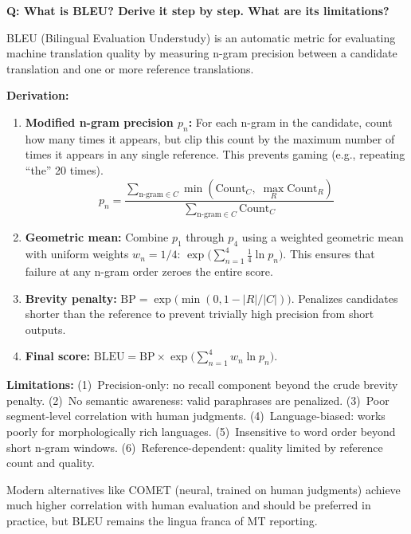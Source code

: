 \begin{interviewq}
\textbf{Q: What is BLEU? Derive it step by step. What are its limitations?}

 \quad {} \quad \badgefreq{\freqhigh}

\stronganswer
BLEU (Bilingual Evaluation Understudy) is an automatic metric for evaluating
machine translation quality by measuring n-gram precision between a candidate
translation and one or more reference translations.

\textbf{Derivation:}
\begin{enumerate}
    \item \textbf{Modified n-gram precision $p_n$:} For each n-gram in the
          candidate, count how many times it appears, but clip this count by
          the maximum number of times it appears in any single reference.
          This prevents gaming (e.g., repeating ``the'' 20 times).
          \[
              p_n = \frac{\sum_{\text{n-gram} \in C}\min(\text{Count}_C,\;\max_R \text{Count}_R)}{\sum_{\text{n-gram} \in C}\text{Count}_C}
          \]

    \item \textbf{Geometric mean:} Combine $p_1$ through $p_4$ using a weighted
          geometric mean with uniform weights $w_n = 1/4$:
          $\exp\!\bigl(\sum_{n=1}^{4}\frac{1}{4}\ln p_n\bigr)$.
          This ensures that failure at any n-gram order zeroes the entire score.

    \item \textbf{Brevity penalty:}
          $\text{BP} = \exp\!\bigl(\min(0, 1 - |R|/|C|)\bigr)$.
          Penalizes candidates shorter than the reference to prevent trivially
          high precision from short outputs.

    \item \textbf{Final score:}
          $\text{BLEU} = \text{BP} \times \exp\!\bigl(\sum_{n=1}^{4}w_n \ln p_n\bigr)$.
\end{enumerate}

\textbf{Limitations:}
(1)~Precision-only: no recall component beyond the crude brevity penalty.
(2)~No semantic awareness: valid paraphrases are penalized.
(3)~Poor segment-level correlation with human judgments.
(4)~Language-biased: works poorly for morphologically rich languages.
(5)~Insensitive to word order beyond short n-gram windows.
(6)~Reference-dependent: quality limited by reference count and quality.

Modern alternatives like COMET (neural, trained on human judgments) achieve
much higher correlation with human evaluation and should be preferred in
practice, but BLEU remains the lingua franca of MT reporting.


\end{interviewq}
